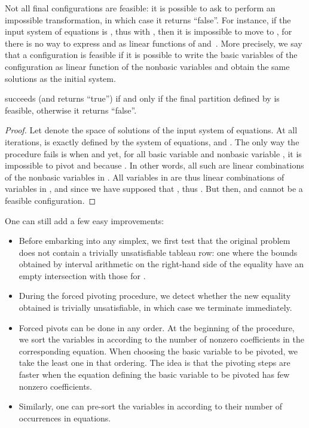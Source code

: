 Not all final configurations are feasible: it is possible to ask  to perform an impossible transformation, in which case it returns ``false''. For instance, if the input system of equations is ,
thus with , then it is impossible to move to , for there is no way to express  and  as linear functions of  and~. More precisely, we say that a configuration is feasible if it is possible to write the basic variables of the configuration as linear function of the nonbasic variables and obtain the same solutions as the initial system.

\begin{lemma}
 succeeds (and returns ``true'') if and only if the final partition defined by  is feasible, otherwise it returns ``false''.
\end{lemma}

\begin{proof}
Let  denote the space of solutions of the input system of equations. At all iterations,  is exactly defined by the system of equations, and .
The only way the procedure fails is when  and yet, for all basic variable  and nonbasic variable , it is impossible to pivot  and  because . In other words, all such  are linear combinations of the nonbasic variables in . All variables in  are thus linear combinations of variables in , and since we have supposed that ,  thus . But then,  and  cannot be a feasible configuration.
\end{proof}

One can still add a few easy improvements:
\begin{itemize}
\item Before embarking into any simplex, we first test that the original problem does not contain a trivially unsatisfiable tableau row: one where the bounds obtained by interval arithmetic on the right-hand side of  the equality have an empty intersection with those for .
\item During the forced pivoting procedure, we detect whether the new equality obtained is trivially unsatisfiable, in which case we terminate immediately.
\item Forced pivots can be done in any order. At the beginning of the procedure, we sort the variables in  according to the number of nonzero coefficients in the corresponding equation. When choosing the basic variable to be pivoted, we take the least one in that ordering. The idea is that the pivoting steps are faster when the equation defining the basic variable to be pivoted has few nonzero coefficients.
\item Similarly, one can pre-sort the variables in  according to their number of occurrences in equations.
\end{itemize}

